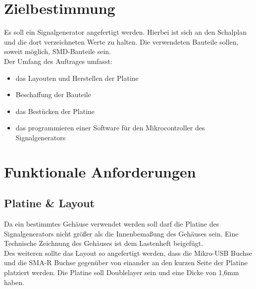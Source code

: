 \documentclass[a4paper,12pt]{article}
\title{\projekt}
\author{\authorName}
\begin{document}
 \maketitle
 \setcounter{page}{2}
 \tableofcontents          %
 \clearpage
 
\section{Zielbestimmung}
Es soll ein Signalgenerator angefertigt werden. Hierbei ist sich an den Schalplan und die dort verzeichneten Werte zu halten.
Die verwendeten Bauteile sollen, soweit möglich, SMD-Bauteile sein.\\
Der Umfang des Auftrages umfasst:
\begin{itemize}
\item{das Layouten und Herstellen der Platine}
\item{Beschaffung der Bauteile}
\item{das Bestücken der Platine}
\item{das programmieren einer Software für den Mikrocontroller des Signalgenerators}
\end{itemize}



\section{Funktionale Anforderungen}

\subsection{Platine \& Layout}

Da ein bestimmtes Gehäuse verwendet werden soll darf die Platine des Signalgenerators nicht größer als
die Innenbemaßung des Gehäuses sein. Eine Technische Zeichnung des Gehäuses ist dem Lastenheft beigefügt.\\
Des weiteren sollte das Layout so angefertigt werden, dass die Mikro-USB Buchse und die SMA-R Buchse gegenüber
von einander an den kurzen Seite der Platine platziert werden.
Die Platine soll Doublelayer sein und eine Dicke von 1,6mm haben.
\end{document}
